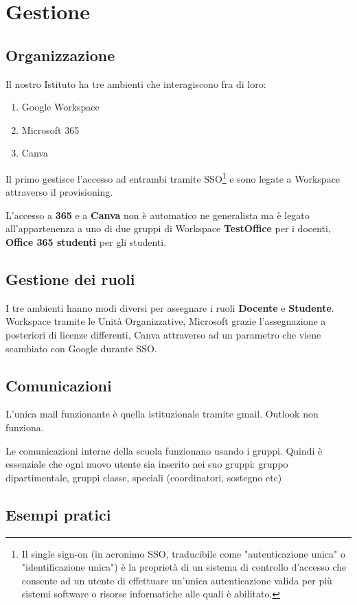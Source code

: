 \chapter{Gestione}
\section{Organizzazione}
Il nostro Istituto ha tre ambienti che interagiscono fra di loro:\begin{enumerate}
	\item Google Workspace
	\item Microsoft 365
	\item Canva
\end{enumerate}
Il primo gestisce l'accesso ad entrambi tramite SSO\footnote{Il single sign-on (in acronimo SSO, traducibile come "autenticazione unica" o "identificazione unica") è la proprietà di un sistema di controllo d'accesso che consente ad un utente di effettuare un'unica autenticazione valida per più sistemi software o risorse informatiche alle quali è abilitato.\cite{itwiki:137336632}} e sono legate a Workspace attraverso il provisioning.

L'accesso a \textbf{365} e a \textbf{Canva} non è automatico ne generalista ma  è legato all'appartenenza a uno di due gruppi di Workspace   \textbf{TestOffice} per i docenti, \textbf{Office 365 studenti} per gli studenti.
\section{Gestione dei ruoli}
I tre ambienti hanno modi  diversi per  assegnare i ruoli \textbf{Docente} e \textbf{Studente}. Workspace tramite le Unità Organizzative,  Microsoft grazie l'assegnazione a posteriori di licenze differenti, Canva attraverso ad un parametro che viene scambiato con Google durante SSO.  
\section{Comunicazioni}
L'unica mail funzionante è quella istituzionale  tramite gmail. Outlook non funziona.

Le comunicazioni interne della scuola funzionano usando i gruppi. Quindi è essenziale che ogni nuovo utente sia inserito nei suo gruppi: gruppo dipartimentale, gruppi classe, speciali (coordinatori, sostegno etc)

\section{Esempi pratici} 
